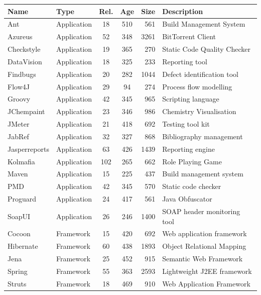 \begin{table}[!]
\centering
\small
\vspace{-0.6cm}
\begin{tabular}{|l|l||c|c|r|p{}|}
\hline
{\bf Name} & {\bf Type} & {\bf Rel.} & {\bf Age} &
             {\bf Size} & {\bf Description}
\\
\hline \hline
Ant&Application&18 & 510 & 561 & Build Management System\\
\hline
Azureus&Application&52 & 348 & 3261 & BitTorrent Client\\
\hline
Checkstyle&Application&19 & 365 & 270 & Static Code Quality Checker\\
\hline
DataVision&Application&18 & 325 & 233 & Reporting tool\\
\hline
Findbugs&Application&20 & 282 & 1044 & Defect identification tool\\
\hline
Flow4J&Application&29 & 94 & 274 & Process flow modelling\\
\hline
Groovy&Application&42 & 345 & 965 & Scripting language\\
\hline
JChempaint&Application&23 & 346 & 986 & Chemistry Visualisation\\
\hline
JMeter&Application&21 & 418 & 692 & Testing tool kit\\
\hline
JabRef&Application&32 & 327 & 868 & Bibliography management\\
\hline
Jasperreports&Application&63 & 426 & 1439 & Reporting engine\\
\hline
Kolmafia&Application&102 & 265 & 662 & Role Playing Game\\
\hline
Maven&Application&15 & 225 & 437 & Build management system\\
\hline
PMD&Application&42 & 345 & 570 & Static code checker\\
\hline
Proguard&Application&24 & 417 & 561 & Java Obfuscator\\
\hline
SoapUI&Application&26 & 246 & 1400 & SOAP header monitoring tool\\
\hline
\hline
Cocoon&Framework&15 & 420 & 692 & Web application framework\\
\hline
Hibernate&Framework&60 & 438 & 1893 & Object Relational Mapping\\
\hline
Jena&Framework&25 & 452 & 915 & Semantic Web Framework\\
\hline
Spring&Framework&55 & 363 & 2593 & Lightweight J2EE framework\\
\hline
Struts&Framework&18 & 469 & 910 & Web Application Framework\\

\end{tabular}
\end{table}
